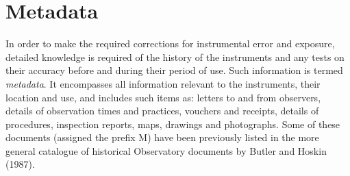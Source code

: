 \documentclass[12pt, epsfig, graphics, rotating, epsf,tifff]{article}
\begin{document}
\section{Metadata}

In order to make the required corrections for instrumental error and exposure,
detailed knowledge is required of the history of the instruments and any tests
on their accuracy before and during their period of use. Such information is
termed {\em metadata}. It encompasses all information relevant to the
instruments, their location and use, and includes such items as: letters to and
from observers, details of observation times and practices, vouchers and
receipts, details of procedures, inspection reports, maps, drawings and
photographs. Some of these documents (assigned the prefix M) have been
previously listed in the more general catalogue of historical Observatory
documents by Butler and Hoskin (1987). 


\medskip
\end{document}
